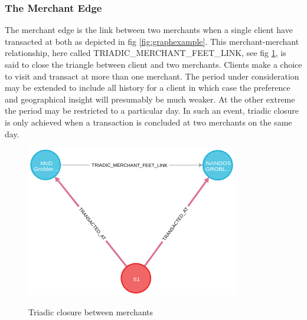 
\subsubsection{The Merchant Edge}

The merchant edge is the link between two merchants when a single client have transacted at both as depicted in fig \ref{fig:graphexample}.  This merchant-merchant relationship, here called TRIADIC\_MERCHANT\_FEET\_LINK, see fig \ref{fig:triadic_closure}, is said to close the triangle between client and two merchants. 
Clients make a choice to visit and transact at more than one merchant. The period under consideration may be extended to include all history for a client in which case the preference and geographical insight will presumably be much weaker.  At the other extreme the period may be restricted to a particular day.  In such an event, triadic closure is only achieved when a transaction is concluded at two merchants on the same day.  

\begin{figure}[htb!]
\caption{Triadic closure between merchants}
\centering
\includegraphics[width=\textwidth]{triadic_closure.png}
\label{fig:triadic_closure}
\end{figure}

